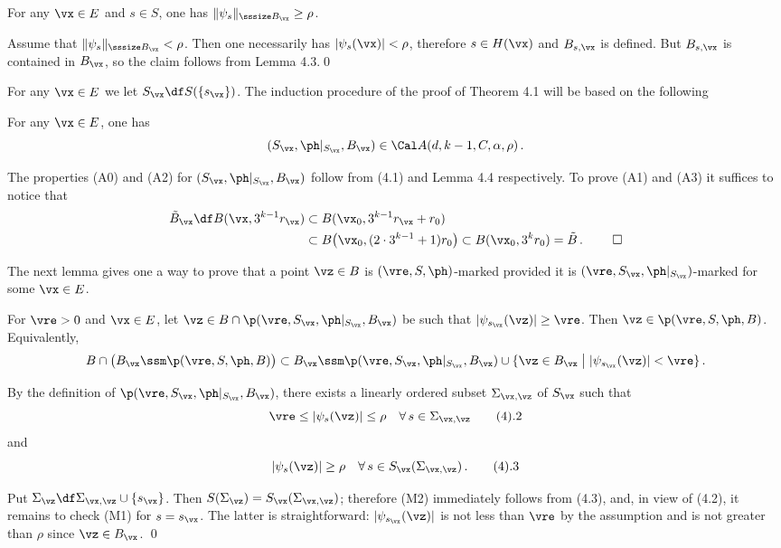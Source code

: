    For any $\vx\in E$ and $s\in S$, one has 
$\|\psi_s\|_{\sssize B_{\vx}} \ge \rho$.
\endproclaim

 Assume that $\|\psi_s\|_{\sssize B_{\vx}} < \rho$. %
Then one necessarily has $|\psi_s(\vx)| < \rho $, therefore $s\in H(\vx)$ and  $B_{s,\vx}$ is defined. But $B_{s,\vx}$ is contained in $ B_{\vx}$, so the claim follows from Lemma 4.3.\qed\enddemo

For any $\vx\in E$ we let $S_\vx\df S(\{s_\vx\})$.
The induction procedure of the proof of Theorem 4.1 will be based on the following

   For any $\vx\in E$, one has 
$$
(S_\vx,\ph|_{S_\vx},B_\vx)\in\Cal A(d,k-1,C,\alpha,\rho)\,.
$$ 
\endproclaim


 The properties (A0) and (A2) for 
$(S_\vx,\ph|_{S_\vx},B_\vx)$ follow from (4.1) and Lemma 4.4 respectively. To prove (A1) and (A3) it suffices to notice that 
$$
\split
\tilde B_\vx\df B(\vx,3^{k-1}r_\vx)&\subset B(\vx_0,3^{k-1}r_\vx + r_0)\\ &\subset B\big(\vx_0,(2\cdot 3^{k-1} + 1)r_0\big)\subset B(\vx_0,3^kr_0) = \tilde B\,.\ \qed
\endsplit
$$
\enddemo 

 The next lemma gives one a way to prove that a point $\vz\in B$ is $(\vre,S,\ph)$-marked provided it is $(\vre,S_\vx,\ph|_{S_\vx})$-marked for some $\vx\in E$.

 For  $\vre > 0$ and $\vx\in E$, let $\vz\in B\cap \p(\vre,S_\vx,\ph|_{S_\vx},B_\vx)$ be such that $|\psi_{s_\vx}(\vz)| \ge\vre$.
Then $\vz\in \p(\vre,S,\ph,B)$. Equivalently, 
$$
B\cap \big(B_\vx\ssm\p(\vre,S,\ph,B)\big) \subset B_\vx\ssm\p(\vre,S_\vx,\ph|_{S_\vx},B_\vx) \cup \{\vz\in B_\vx\bigm| |\psi_{s_\vx}(\vz)|  < \vre\}\,.
$$
\endproclaim


 By the definition of $\p(\vre,S_\vx,\ph|_{S_\vx},B_\vx)$, there exists 
a linearly ordered subset $\Sigma_{\vx,\vz}$ of $S_\vx$ such that $$
\vre\le |\psi_s(\vz)| \le \rho\quad \forall\,s\in\Sigma_{\vx,\vz}\tag 4.2
$$
and
$$
|\psi_s(\vz)| \ge  \rho \quad\forall\,s\in S_\vx(\Sigma_{\vx,\vz})\,.\tag 4.3
$$

Put $\Sigma_{\vz}\df\Sigma_{\vx,\vz}\cup\{s_\vx\}$. Then $S(\Sigma_{\vz}) = S_\vx(\Sigma_{\vx,\vz})$; therefore (M2) immediately follows from (4.3), and, in view of (4.2),  it remains to check (M1) for $s = s_\vx$. The latter is straightforward: $|\psi_{s_\vx}(\vz)|$ is not less than $\vre$ by the assumption and 
is not greater than $\rho $ since $\vz\in B_\vx$. \qed\enddemo 


